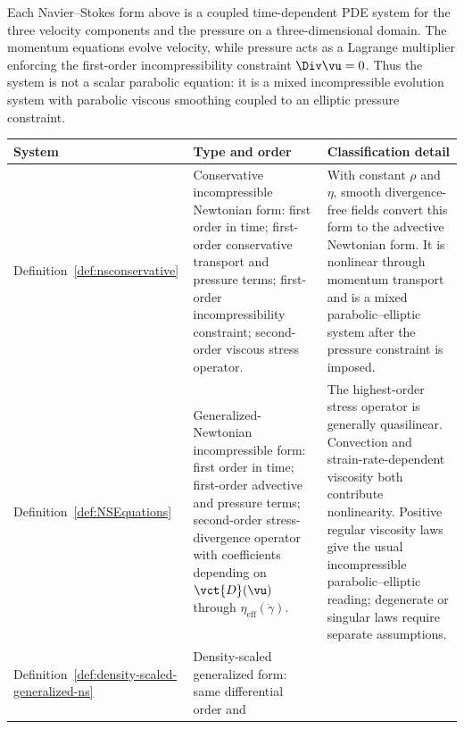 \begin{remark}
    \label{rmk:ns-system-classification}
    Each Navier--Stokes form above is a coupled time-dependent PDE system for
    the three velocity components and the pressure on a three-dimensional
    domain. The momentum equations evolve velocity, while pressure acts as a
    Lagrange multiplier enforcing the first-order incompressibility constraint
    $\Div\vu=0$. Thus the system is not a scalar parabolic equation: it is a
    mixed incompressible evolution system with parabolic viscous smoothing
    coupled to an elliptic pressure constraint.
    \begin{center}
    \footnotesize
    \begin{tabularx}{\textwidth}{@{}
        >{\raggedright\arraybackslash}p{}
        >{\raggedright\arraybackslash}p{}
        >{\raggedright\arraybackslash}X
        @{}}
        \toprule
        \textbf{System}
            & \textbf{Type and order}
            & \textbf{Classification detail} \\
        \midrule
        Definition~\ref{def:nsconservative}
            & Conservative incompressible Newtonian form: first order in time;
            first-order conservative transport and pressure terms; first-order
            incompressibility constraint; second-order viscous stress operator.
            & With constant $\rho$ and $\eta$, smooth divergence-free fields
            convert this form to the advective Newtonian form. It is nonlinear
            through momentum transport and is a mixed parabolic--elliptic
            system after the pressure constraint is imposed. \\
        Definition~\ref{def:NSEquations}
            & Generalized-Newtonian incompressible form: first order in time;
            first-order advective and pressure terms; second-order
            stress-divergence operator with coefficients depending on
            $\vct{D}(\vu)$ through $\eta_{\mathrm{eff}}(\dot\gamma)$.
            & The highest-order stress operator is generally quasilinear.
            Convection and strain-rate-dependent viscosity both contribute
            nonlinearity. Positive regular viscosity laws give the usual
            incompressible parabolic--elliptic reading; degenerate or singular
            laws require separate assumptions. \\
        Definition~\ref{def:density-scaled-generalized-ns}
            & Density-scaled generalized form: same differential order and

\end{tabularx}
\end{center}
\end{remark}
